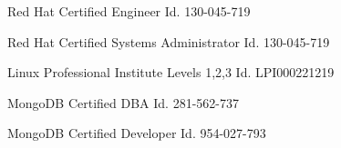 \begin{cvskills}
  \cvskill
    {Red Hat Certified Engineer} %
    {Id. 130-045-719} %

  \cvskill
    {Red Hat Certified Systems Administrator} %
    {Id. 130-045-719} %

  \cvskill
    {Linux Professional Institute Levels 1,2,3} %
    {Id. LPI000221219} %

  \cvskill
    {MongoDB Certified DBA} %
    {Id. 281-562-737} %

  \cvskill
    {MongoDB Certified Developer} %
    {Id. 954-027-793} %

\end{cvskills}
